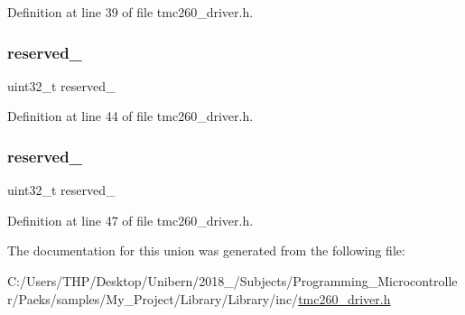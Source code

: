Definition at line 39 of file tmc260\+\_\+driver.\+h.

\mbox{\label{uniontmc260___driver_control_register___aa5d9ea4624bf97017a821a70177c6bdb}} 
\subsubsection{\texorpdfstring{reserved\+\_}{reserved\_1}}
{\footnotesize\ttfamily uint32\+\_\+t reserved\+\_}



Definition at line 44 of file tmc260\+\_\+driver.\+h.

\mbox{\label{uniontmc260___driver_control_register___a50b223df92282d04dfa46306b53a9905}} 
\subsubsection{\texorpdfstring{reserved\+\_}{reserved\_2}}
{\footnotesize\ttfamily uint32\+\_\+t reserved\+\_}



Definition at line 47 of file tmc260\+\_\+driver.\+h.



The documentation for this union was generated from the following file\+:\begin{DoxyCompactItemize}
\item 
C\+:/\+Users/\+T\+H\+P/\+Desktop/\+Unibern/2018\+\_/\+Subjects/\+Programming\+\_\+\+Microcontroller/\+Paeks/samples/\+My\+\_\+\+Project/\+Library/\+Library/inc/\mbox{\hyperlink{tmc260__driver_8h}{tmc260\+\_\+driver.\+h}}\end{DoxyCompactItemize}
